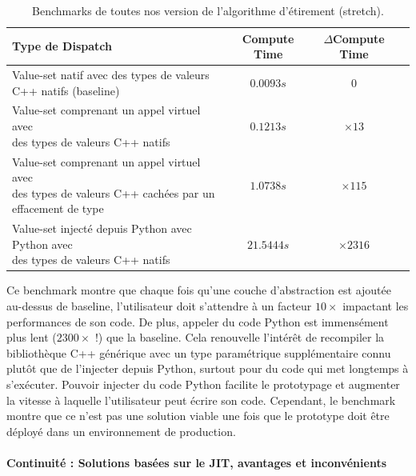 \begin{table}[htbp]
  \footnotesize
  \centering
  \begin{tabular}{l|ccc}
    \toprule
    Type de Dispatch &
    Compute Time     &
    \(\Delta{}\)Compute Time
    \\ \midrule Value-set natif avec des types de valeurs C++ natifs (baseline)
                     & \(0.0093s\) & \(0\)                        \\
    \makecell[l]{Value-set comprenant un appel virtuel avec       \\ des types de valeurs C++ natifs}      &
    \(0.1213s\)      &
    \(\times 13\)
    \\
    \makecell[l]{Value-set comprenant un appel virtuel avec       \\ des types de valeurs C++ cachées par un effacement de type} &
    \(1.0738s\)      &
    \(\times 115\)
    \\
    \makecell[l]{Value-set injecté depuis Python avec Python avec \\ des types de valeurs C++ natifs} &
    \(21.5444s\)     &
    \(\times 2316\)
    \\
    \bottomrule
  \end{tabular}
  \caption[]{Benchmarks de toutes nos version de l'algorithme d'étirement (stretch).}
  \label{resume:table:static.dynamic.perfs}
\end{table}

Ce benchmark montre que chaque fois qu'une couche d'abstraction est ajoutée au-dessus de baseline, l'utilisateur doit
s'attendre à un facteur \(10\times\) impactant les performances de son code. De plus, appeler du code Python est
immensément plus lent (\(2300\times\) !) que la baseline. Cela renouvelle l'intérêt de recompiler la bibliothèque C++
générique avec un type paramétrique supplémentaire connu plutôt que de l'injecter depuis Python, surtout pour du code
qui met longtemps à s'exécuter. Pouvoir injecter du code Python facilite le prototypage et augmenter la vitesse à
laquelle l'utilisateur peut écrire son code. Cependant, le benchmark montre que ce n'est pas une solution viable une
fois que le prototype doit être déployé dans un environnement de production.

\paragraph{Continuité : Solutions basées sur le JIT, avantages et inconvénients}

